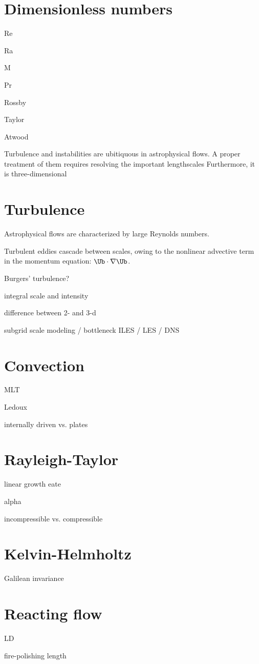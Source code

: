 \section{Dimensionless numbers}


Re

Ra

M

Pr

Rossby

Taylor

Atwood


Turbulence and instabilities are ubitiquous in astrophysical flows.  
A proper treatment of them requires resolving the important lengthscales
Furthermore, it is three-dimensional


\section{Turbulence}

Astrophysical flows are characterized by large Reynolds numbers.  

Turbulent eddies cascade between scales, owing to the nonlinear advective 
term in the momentum equation: $\Ub \cdot \nabla \Ub$.  

Burgers' turbulence?

integral scale and intensity

difference between 2- and 3-d

subgrid scale modeling / bottleneck
ILES / LES / DNS








\section{Convection}

MLT

Ledoux

internally driven vs. plates





\section{Rayleigh-Taylor}

linear growth eate

alpha

incompressible vs. compressible



\section{Kelvin-Helmholtz}


Galilean invariance



\section{Reacting flow}

LD

fire-polishing length


